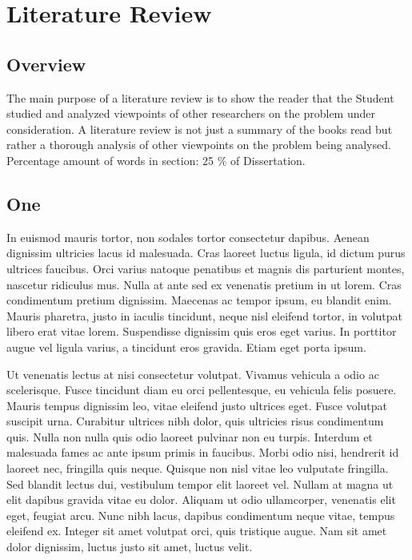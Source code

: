 
\chapter{Literature Review}
\begin{spacing}{2.0}

\section{Overview}

The main purpose of a literature review is to show the reader that the Student studied and analyzed viewpoints of other researchers on the problem under consideration. A literature review is not just a summary of the books read but rather a thorough analysis of other viewpoints on the problem being analysed. Percentage amount of words in section: 25 \% of Dissertation.


\section{One}
In euismod mauris tortor, non sodales tortor consectetur dapibus. Aenean dignissim ultricies lacus id malesuada. Cras laoreet luctus ligula, id dictum purus ultrices faucibus. Orci varius natoque penatibus et magnis dis parturient montes, nascetur ridiculus mus. Nulla at ante sed ex venenatis pretium in ut lorem. Cras condimentum pretium dignissim. Maecenas ac tempor ipsum, eu blandit enim. Mauris pharetra, justo in iaculis tincidunt, neque nisl eleifend tortor, in volutpat libero erat vitae lorem. Suspendisse dignissim quis eros eget varius. In porttitor augue vel ligula varius, a tincidunt eros gravida. Etiam eget porta ipsum.

Ut venenatis lectus at nisi consectetur volutpat. Vivamus vehicula a odio ac scelerisque. Fusce tincidunt diam eu orci pellentesque, eu vehicula felis posuere. Mauris tempus dignissim leo, vitae eleifend justo ultrices eget. Fusce volutpat suscipit urna. Curabitur ultrices nibh dolor, quis ultricies risus condimentum quis. Nulla non nulla quis odio laoreet pulvinar non eu turpis. Interdum et malesuada fames ac ante ipsum primis in faucibus. Morbi odio nisi, hendrerit id laoreet nec, fringilla quis neque. Quisque non nisl vitae leo vulputate fringilla. Sed blandit lectus dui, vestibulum tempor elit laoreet vel. Nullam at magna ut elit dapibus gravida vitae eu dolor. Aliquam ut odio ullamcorper, venenatis elit eget, feugiat arcu. Nunc nibh lacus, dapibus condimentum neque vitae, tempus eleifend ex. Integer sit amet volutpat orci, quis tristique augue. Nam sit amet dolor dignissim, luctus justo sit amet, luctus velit.


\end{spacing}
